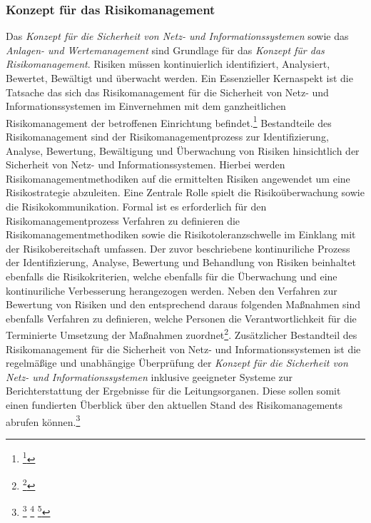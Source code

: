 \documentclass[11pt,a4paper,hidelinks]{article}   %
\begin{document}
            \subsubsection{Konzept für das Risikomanagement}
            Das \emph{Konzept für die Sicherheit von Netz- und Informationssystemen} sowie das \emph{Anlagen- und Wertemanagement} sind Grundlage für das \emph{Konzept für das Risikomanagement}. Risiken müssen kontinuierlich identifiziert, Analysiert, Bewertet, Bewältigt und überwacht werden. Ein Essenzieller Kernaspekt ist die Tatsache das sich das Risikomanagement für die Sicherheit von Netz- und Informationssystemen im Einvernehmen mit dem ganzheitlichen Risikomanagement der betroffenen Einrichtung befindet.\footnote{\footcite[Vgl.][, Anhang, Nummer 2.1.1.]{EU2024-2690}} Bestandteile des Risikomanagement sind der Risikomanagementprozess zur Identifizierung, Analyse, Bewertung, Bewältigung und Überwachung von Risiken hinsichtlich der Sicherheit von Netz- und Informationssystemen. Hierbei werden Risikomanagementmethodiken auf die ermittelten Risiken angewendet um eine Risikostrategie abzuleiten. Eine Zentrale Rolle spielt die Risikoüberwachung sowie die Risikokommunikation. Formal ist es erforderlich für den Risikomanagementprozess Verfahren zu definieren die Risikomanagementmethodiken sowie die Risikotoleranzschwelle im Einklang mit der Risikobereitschaft umfassen. Der zuvor beschriebene kontinuriliche Prozess der Identifizierung, Analyse, Bewertung und Behandlung von Risiken beinhaltet ebenfalls die Risikokriterien, welche ebenfalls für die Überwachung und eine kontinuriliche Verbesserung herangezogen werden. Neben den Verfahren zur Bewertung von Risiken und den entsprechend daraus folgenden Maßnahmen sind ebenfalls Verfahren zu definieren, welche Personen die Verantwortlichkeit für die Terminierte Umsetzung der Maßnahmen zuordnet\footnote{\footcite[Vgl.][, Anhang, Nummer 2.1.2. \& 2.1.3.]{EU2024-2690}}. Zusätzlicher Bestandteil des Risikomanagement für die Sicherheit von Netz- und Informationssystemen ist die regelmäßige und unabhängige Überprüfung der \emph{Konzept für die Sicherheit von Netz- und Informationssystemen} inklusive geeigneter Systeme zur Berichterstattung der Ergebnisse für die Leitungsorganen. Diese sollen somit einen fundierten Überblick über den aktuellen Stand des Risikomanagements abrufen können.\footnote{
                \footcite[Vgl.][, Anhang, Nummer 2.2.1., 2.3.1. \& 2.3.2.]{EU2024-2690}
                \footcite[Vgl.][, S. 1]{iso31000-2018}
                \footcite[Vgl.][, §30 Absatz 1 \& Absatz 2, Nummer 1]{NIS2UmsuCG}
            }
\end{document}
